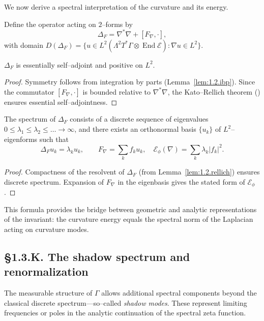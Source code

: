 We now derive a spectral interpretation of the curvature and its energy.

\begin{definition}
Define the operator acting on $2$–forms by
\[
\Delta_F = \nabla^\ast\nabla + [F_\nabla,\cdot],
\]
with domain 
$D(\Delta_F)=\{u\in L^2(\Lambda^2 T^\ast\Gamma\otimes\operatorname{End}\mathcal E):\nabla u\in L^2\}$.
\end{definition}

\begin{lemma}\label{lem:1.3.self}
$\Delta_F$ is essentially self–adjoint and positive on $L^2$.
\end{lemma}

\begin{proof}
Symmetry follows from integration by parts (Lemma~\ref{lem:1.2.ibp}).  
Since the commutator $[F_\nabla,\cdot]$ is bounded relative to $\nabla^\ast\nabla$, the Kato–Rellich theorem (\cite{Kato1995}) ensures essential self–adjointness.
\end{proof}

\begin{theorem}\label{thm:1.3.spectrum}
The spectrum of $\Delta_F$ consists of a discrete sequence of eigenvalues
$0\le\lambda_1\le\lambda_2\le\dots\to\infty$, 
and there exists an orthonormal basis $\{u_k\}$ of $L^2$–eigenforms such that
\[
\Delta_F u_k = \lambda_k u_k,\qquad 
F_\nabla = \sum_k f_k u_k,\quad
\mathcal E_\phi(\nabla)=\sum_k \lambda_k |f_k|^2.
\]
\end{theorem}

\begin{proof}
Compactness of the resolvent of $\Delta_F$ (from Lemma~\ref{lem:1.2.rellich}) ensures discrete spectrum. Expansion of $F_\nabla$ in the eigenbasis gives the stated form of $\mathcal E_\phi$.
\end{proof}

\begin{remark}
This formula provides the bridge between geometric and analytic representations of the invariant: the curvature energy equals the spectral norm of the Laplacian acting on curvature modes.
\end{remark}

\subsection*{§1.3.K. The shadow spectrum and renormalization}

The measurable structure of $\Gamma$ allows additional spectral components beyond the classical discrete spectrum—so–called \emph{shadow modes}. These represent limiting frequencies or poles in the analytic continuation of the spectral zeta function.

